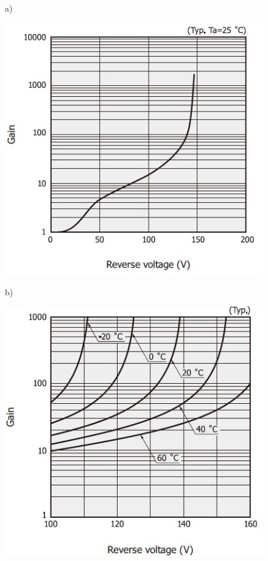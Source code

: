 \begin{figure}[tbh]
	\centering
	a)
	\begin{minipage}{.45\textwidth}
		\includegraphics[width=\linewidth]{./ImageFiles/apd_gain_rv.jpg}
	\end{minipage}
	b)
	\begin{minipage}{.45\textwidth}
		\includegraphics[width=\linewidth]{./ImageFiles/apd_gain_temp.jpg}

\end{minipage}
\end{figure}
